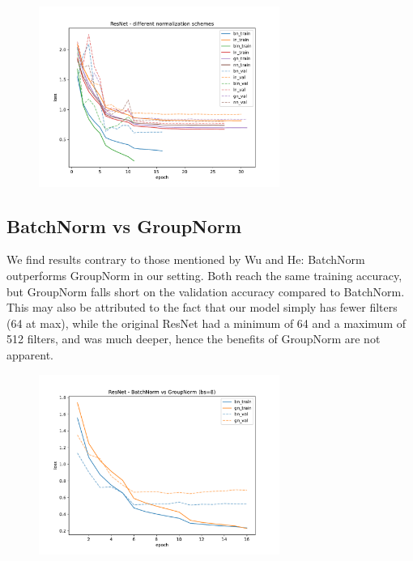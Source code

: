 \documentclass[12pt]{article}
\begin{document}
\begin{center}
\begin{figure}[!htbp]
    \centering
    \includegraphics[width=0.7\textwidth]{q2_part3.pdf}
\end{figure}
\end{center}

\pagebreak

\subsection{BatchNorm vs GroupNorm}

We find results contrary to those mentioned by Wu and He: BatchNorm outperforms
GroupNorm in our setting. Both reach the same training accuracy, but GroupNorm
falls short on the validation accuracy compared to BatchNorm. This may also be 
attributed to the fact that our model simply has fewer filters (64 at max), 
while the original ResNet had a minimum of 64 and a maximum of 512 filters, and
was much deeper, hence the benefits of GroupNorm are not apparent.

\begin{center}
\begin{figure}[!htbp]
    \centering
    \includegraphics[width=0.7\textwidth]{q2_part6.pdf}
\end{figure}
\end{center}
\end{document}
